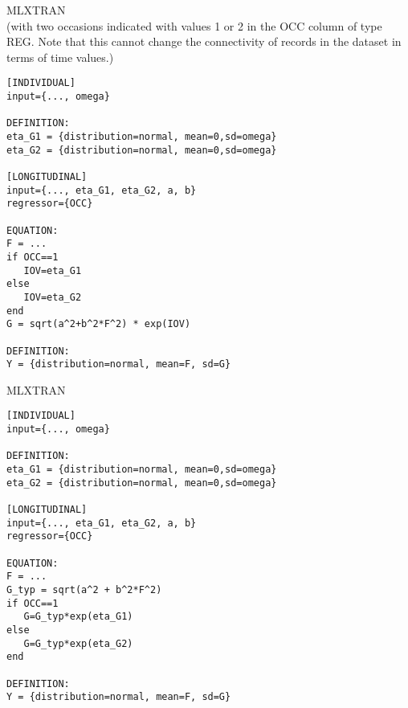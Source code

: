 %
 
\begin{lrbox}{\lstbox}\begin{minipage}{16cm} 
MLXTRAN \\
 (with two occasions indicated with values 1 or 2 in the OCC column of type REG.  
Note that this cannot change the connectivity of records in the dataset in terms of time values.)
 
\begin{lstlisting}[frame=single,language=MLX]
[INDIVIDUAL]
input={..., omega}

DEFINITION:
eta_G1 = {distribution=normal, mean=0,sd=omega}
eta_G2 = {distribution=normal, mean=0,sd=omega}

[LONGITUDINAL]
input={..., eta_G1, eta_G2, a, b}
regressor={OCC}

EQUATION:
F = ...
if OCC==1
   IOV=eta_G1
else
   IOV=eta_G2
end
G = sqrt(a^2+b^2*F^2) * exp(IOV)

DEFINITION:
Y = {distribution=normal, mean=F, sd=G}
\end{lstlisting}   
\end{minipage}\end{lrbox}
\usebox\lstbox
%


\begin{lrbox}{\lstbox}\begin{minipage}{16cm} 
MLXTRAN \\
\begin{lstlisting}[frame=single,language=MLX]
[INDIVIDUAL]
input={..., omega}

DEFINITION:
eta_G1 = {distribution=normal, mean=0,sd=omega}
eta_G2 = {distribution=normal, mean=0,sd=omega}

[LONGITUDINAL]
input={..., eta_G1, eta_G2, a, b}
regressor={OCC}

EQUATION:
F = ...
G_typ = sqrt(a^2 + b^2*F^2)
if OCC==1
   G=G_typ*exp(eta_G1)
else
   G=G_typ*exp(eta_G2)
end

DEFINITION:
Y = {distribution=normal, mean=F, sd=G}
\end{lstlisting}   
\end{minipage}\end{lrbox}
\usebox\lstbox

